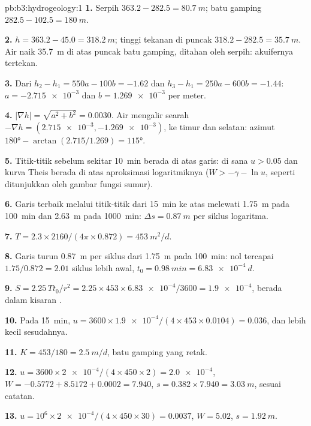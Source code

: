 \begin{solution}{pb:b3:hydrogeology:1}
\textbf{1.} Serpih $363.2 - 282.5 = \qty{80.7}{m}$; batu gamping $282.5 -
102.5 = \qty{180}{m}$.

\textbf{2.} $h = 363.2 - 45.0 = \qty{318.2}{m}$; tinggi tekanan di puncak
$318.2 - 282.5 = \qty{35.7}{m}$. Air naik \qty{35.7}{m} di atas
puncak batu gamping, ditahan oleh serpih: akuifernya tertekan.

\textbf{3.} Dari $h_2 - h_1 = 550a - 100b = -1.62$ dan $h_3 - h_1 = 250a
- 600b = -1.44$: $a = \num{-2.715e-3}$ dan $b = \num{1.269e-3}$ per
meter.

\textbf{4.} $|\nabla h| = \sqrt{a^2 + b^2} = \num{0.0030}$. Air mengalir
searah $-\nabla h = (\num{2.715e-3}, \num{-1.269e-3})$, ke timur dan
selatan: azimut $\ang{180} - \arctan(2.715/1.269) = \ang{115}$.

\textbf{5.} Titik-titik sebelum sekitar \qty{10}{min} berada di atas garis:
di sana $u > 0.05$ dan kurva Theis berada di atas aproksimasi logaritmiknya
($W > -\gamma - \ln u$, seperti ditunjukkan oleh gambar fungsi sumur).

\textbf{6.} Garis terbaik melalui titik-titik dari \qty{15}{min} ke atas
melewati \qty{1.75}{m} pada \qty{100}{min} dan \qty{2.63}{m} pada \qty{1000}{min}:
$\Delta s = \qty{0.87}{m}$ per siklus logaritma.

\textbf{7.} $T = 2.3\times2160/(4\pi\times0.872) = \qty{453}{m^2/d}$.

\textbf{8.} Garis turun \qty{0.87}{m} per siklus dari \qty{1.75}{m} pada
\qty{100}{min}: nol tercapai $1.75/0.872 = 2.01$ siklus lebih awal,
$t_0 = \qty{0.98}{min} = \qty{6.83e-4}{d}$.

\textbf{9.} $S = 2.25\,Tt_0/r^2 = 2.25\times453\times\num{6.83e-4}/3600 =
\num{1.9e-4}$, berada dalam kisaran .

\textbf{10.} Pada \qty{15}{min}, $u = 3600\times\num{1.9e-4}/(4\times453
\times0.0104) = \num{0.036}$, dan lebih kecil sesudahnya.

\textbf{11.} $K = 453/180 = \qty{2.5}{m/d}$, batu gamping yang retak.

\textbf{12.} $u = 3600\times\num{2e-4}/(4\times450\times2) =
\num{2.0e-4}$, $W = -0.5772 + 8.5172 + 0.0002 = \num{7.940}$, $s =
0.382\times7.940 = \qty{3.03}{m}$, sesuai catatan.

\textbf{13.} $u = 10^6\times\num{2e-4}/(4\times450\times30) =
\num{0.0037}$, $W = \num{5.02}$, $s = \qty{1.92}{m}$.


\end{solution}

